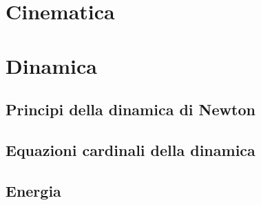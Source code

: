 
\chapter{Cinematica}

\chapter{Dinamica}
\section{Principi della dinamica di Newton}
\section{Equazioni cardinali della dinamica}
\section{Energia}
